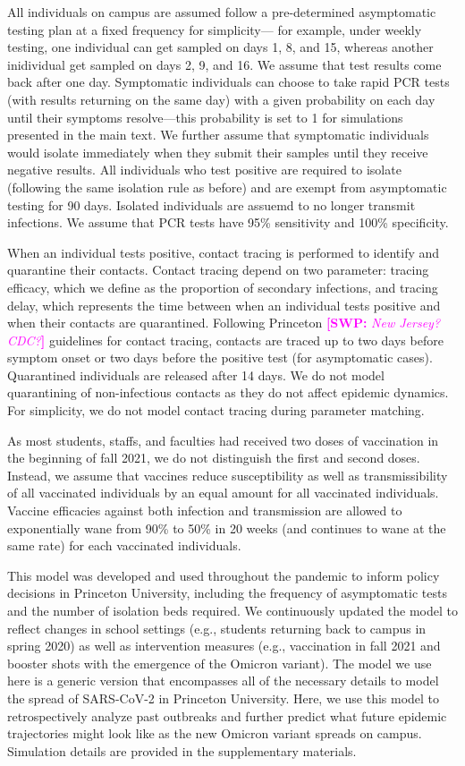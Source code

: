 \documentclass[12pt]{article}
\newcommand{\comment}[3]{\textcolor{#1}{\textbf{[#2: }\textsl{#3}\textbf{]}}}
\newcommand{\swp}[1]{\comment{magenta}{SWP}{#1}}
\begin{document}
All individuals on campus are assumed follow a pre-determined asymptomatic testing plan at a fixed frequency for simplicity---
for example, under weekly testing, one individual can get sampled on days 1, 8, and 15, whereas another inidividual get sampled on days 2, 9, and 16.
We assume that test results come back after one day.
Symptomatic individuals can choose to take rapid PCR tests (with results returning on the same day) with a given probability on each day until their symptoms resolve---this probability is set to 1 for simulations presented in the main text.
We further assume that symptomatic individuals would isolate immediately when they submit their samples until they receive negative results.
All individuals who test positive are required to isolate (following the same isolation rule as before) and are exempt from asymptomatic testing for 90 days.
Isolated individuals are assuemd to no longer transmit infections.
We assume that PCR tests have 95\% sensitivity and 100\% specificity.

When an individual tests positive, contact tracing is performed to identify and quarantine their contacts.
Contact tracing depend on two parameter: tracing efficacy, which we define as the proportion of secondary infections, and tracing delay, which represents the time between when an individual tests positive and when their contacts are quarantined.
Following Princeton \swp{New Jersey? CDC?} guidelines for contact tracing, contacts are traced up to two days before symptom onset or two days before the positive test (for asymptomatic cases).
Quarantined individuals are released after 14 days.
We do not model quarantining of non-infectious contacts as they do not affect epidemic dynamics.
For simplicity, we do not model contact tracing during parameter matching.

As most students, staffs, and faculties had received two doses of vaccination in the beginning of fall 2021, we do not distinguish the first and second doses.
Instead, we assume that vaccines reduce susceptibility as well as transmissibility of all vaccinated individuals by an equal amount for all vaccinated individuals.
Vaccine efficacies against both infection and transmission are allowed to exponentially wane from 90\% to 50\% in 20 weeks (and continues to wane at the same rate) for each vaccinated individuals.

This model was developed and used throughout the pandemic to inform policy decisions in Princeton University, including the frequency of asymptomatic tests and the number of isolation beds required.
We continuously updated the model to reflect changes in school settings (e.g., students returning back to campus in spring 2020) as well as intervention measures (e.g., vaccination in fall 2021 and booster shots with the emergence of the Omicron variant).
The model we use here is a generic version that encompasses all of the necessary details to model the spread of SARS-CoV-2 in Princeton University.
Here, we use this model to retrospectively analyze past outbreaks and further predict what future epidemic trajectories might look like as the new Omicron variant spreads on campus.
Simulation details are provided in the supplementary materials.
\end{document}
